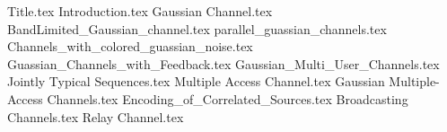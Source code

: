 \documentclass{article}
\title{}
\author{}
\date{}
\begin{document}
\maketitle
{Title.tex}
\newpage
{
\hypersetup{linkcolor=black}
\tableofcontents
}
\newpage
{Introduction.tex}
{Gaussian Channel.tex}
{BandLimited_Gaussian_channel.tex}
{parallel_guassian_channels.tex}
{Channels_with_colored_guassian_noise.tex}
{Guassian_Channels_with_Feedback.tex}
{Gaussian_Multi_User_Channels.tex}
{Jointly Typical Sequences.tex}
{Multiple Access Channel.tex}
{Gaussian Multiple-Access Channels.tex}
{Encoding_of_Correlated_Sources.tex}
{Broadcasting Channels.tex}
{Relay Channel.tex}

\nocite{TC1, TC2, TC3}
\newpage

 

\end{document}
